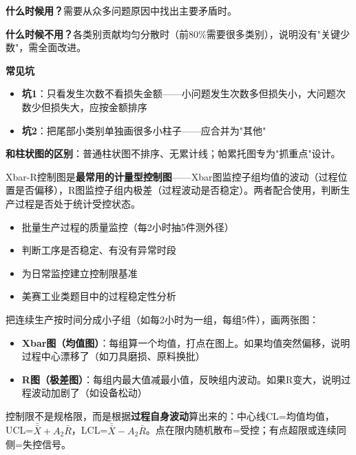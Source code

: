 \begin{algonotes}
\textbf{什么时候用？}需要从众多问题原因中找出主要矛盾时。

\textbf{什么时候不用？}各类别贡献均匀分散时（前80\%需要很多类别），说明没有"关键少数"，需全面改进。

\textbf{常见坑}
\begin{itemize}
    \item \textbf{坑1}：只看发生次数不看损失金额——小问题发生次数多但损失小，大问题次数少但损失大，应按金额排序
    \item \textbf{坑2}：把尾部小类别单独画很多小柱子——应合并为"其他"
\end{itemize}

\textbf{和柱状图的区别}：普通柱状图不排序、无累计线；帕累托图专为"抓重点"设计。
\end{algonotes}


\begin{algointro}
Xbar-R控制图是\textbf{最常用的计量型控制图}——Xbar图监控子组均值的波动（过程位置是否偏移），R图监控子组内极差（过程波动是否稳定）。两者配合使用，判断生产过程是否处于统计受控状态。
\end{algointro}

\begin{algoscene}
\begin{itemize}
    \item 批量生产过程的质量监控（每2小时抽5件测外径）
    \item 判断工序是否稳定、有没有异常时段
    \item 为日常监控建立控制限基准
    \item 美赛工业类题目中的过程稳定性分析
\end{itemize}
\end{algoscene}

\begin{algoprinciple}
把连续生产按时间分成小子组（如每2小时为一组，每组5件），画两张图：

\begin{itemize}
    \item \textbf{Xbar图（均值图）}：每组算一个均值，打点在图上。如果均值突然偏移，说明过程中心漂移了（如刀具磨损、原料换批）
    \item \textbf{R图（极差图）}：每组内最大值减最小值，反映组内波动。如果R变大，说明过程波动加剧了（如设备松动）
\end{itemize}

控制限不是规格限，而是根据\textbf{过程自身波动}算出来的：中心线CL=均值均值，UCL=$\bar{\bar{X}}+A_2\bar{R}$，LCL=$\bar{\bar{X}}-A_2\bar{R}$。点在限内随机散布=受控；有点超限或连续同侧=失控信号。
\end{algoprinciple}

